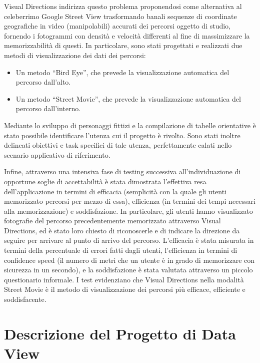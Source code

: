 \documentclass[12pt,a4paper,openright, notitlepage]{report}
\begin{document}
Visual Directions indirizza questo problema proponendosi come alternativa al celeberrimo Google Street View trasformando banali sequenze di coordinate geografiche in video (manipolabili) accurati dei percorsi oggetto di studio, fornendo i fotogrammi con densità e velocità differenti al fine di massimizzare la memorizzabilità di questi. In particolare, sono stati progettati e realizzati due metodi di visualizzazione dei dati dei percorsi:

\begin{itemize}
\item Un metodo “Bird Eye”, che prevede la visualizzazione automatica del percorso dall’alto.
\item Un metodo “Street Movie”, che prevede la visualizzazione automatica del percorso dall’interno.
\end{itemize}

Mediante lo sviluppo di personaggi fittizi e la compilazione di tabelle orientative è stato possibile identificare l’utenza cui il progetto è rivolto. Sono stati inoltre delineati obiettivi e task specifici di tale utenza, perfettamente calati nello scenario applicativo di riferimento.

Infine, attraverso una intensiva fase di testing successiva all’individuazione di opportune soglie di accettabilità è stata dimostrata l’effettiva resa dell’applicazione in termini di efficacia (semplicità con la quale gli utenti memorizzato percorsi per mezzo di essa), efficienza (in termini dei tempi necessari alla memorizzazione) e soddisfazione. In particolare, gli utenti hanno visualizzato fotografie del percorso precedentemente memorizzato attraverso Visual Directions, ed è stato loro chiesto di riconoscerle e di indicare la direzione da seguire per arrivare al punto di arrivo del percorso. L’efficacia è stata misurata in termini della percentuale di errori fatti dagli utenti, l’efficienza in termini di confidence speed (il numero di metri che un utente è in grado di memorizzare con sicurezza in un secondo), e la soddisfazione è stata valutata attraverso un piccolo questionario informale. I test evidenziano che Visual Directions nella modalità Street Movie è il metodo di visualizzazione dei percorsi più efficace, efficiente e soddisfacente.


\chapter{Descrizione del Progetto di Data View}
\end{document}
